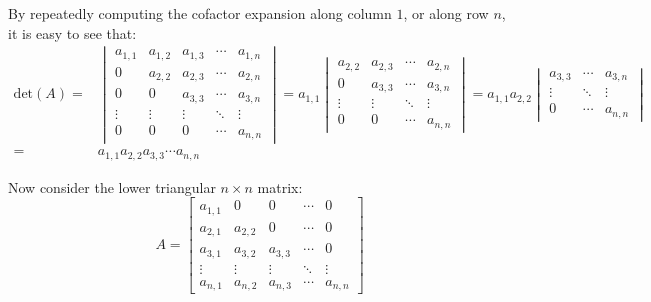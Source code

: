 \documentclass{article}
\begin{document}
By repeatedly computing the cofactor expansion along column \(1\), or along row \(n\), it is easy to see that: 
\begin{align*}
\text{det}(A) = & \begin{vmatrix} a_{1,1} & a_{1,2} & a_{1,3} & \cdots & a_{1,n} \\ 0 & a_{2,2} & a_{2,3} & \cdots & a_{2,n} \\ 0 & 0 & a_{3,3} & \cdots & a_{3,n} \\ \vdots & \vdots & \vdots & \ddots & \vdots \\ 0 & 0 & 0 & \cdots & a_{n,n} \end{vmatrix} 
= a_{1,1}\begin{vmatrix} a_{2,2} & a_{2,3} & \cdots & a_{2,n} \\ 0 & a_{3,3} & \cdots & a_{3,n} \\ \vdots & \vdots & \ddots & \vdots \\ 0 & 0 & \cdots & a_{n,n} \end{vmatrix} 
= a_{1,1}a_{2,2}\begin{vmatrix} a_{3,3} & \cdots & a_{3,n} \\ \vdots & \ddots & \vdots \\ 0 & \cdots & a_{n,n} \end{vmatrix} \\
= & a_{1,1}a_{2,2}a_{3,3} \cdots a_{n,n}
\end{align*}


Now consider the lower triangular \(n \times n\) matrix:
\[A = \begin{bmatrix} a_{1,1} & 0 & 0 & \cdots & 0 \\ a_{2,1} & a_{2,2} & 0 & \cdots & 0 \\ a_{3,1} & a_{3,2} & a_{3,3} & \cdots & 0 \\ \vdots & \vdots & \vdots & \ddots & \vdots \\ a_{n,1} & a_{n,2} & a_{n,3} & \cdots & a_{n,n} \end{bmatrix}\]
\end{document}
